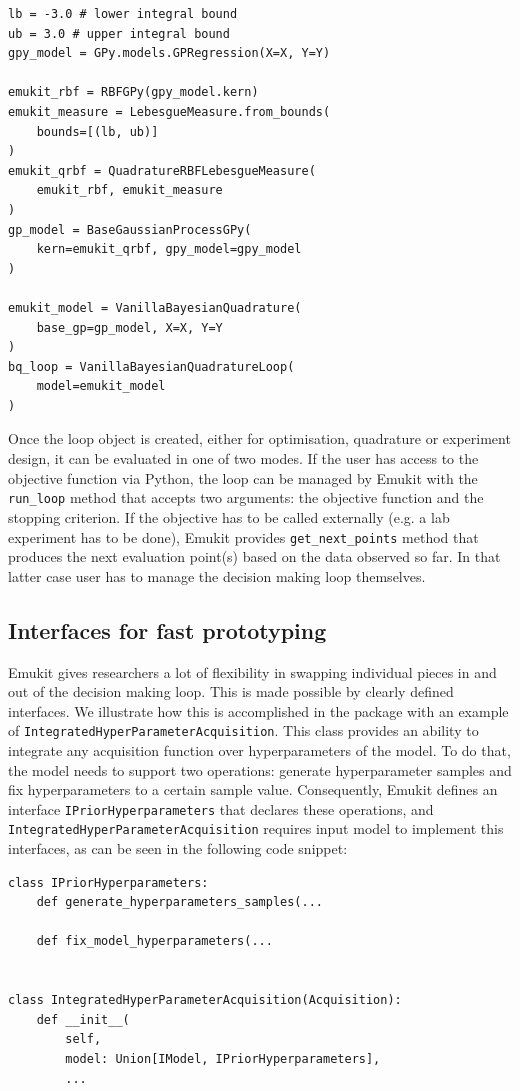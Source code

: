 \begin{verbatim}
lb = -3.0 # lower integral bound
ub = 3.0 # upper integral bound
gpy_model = GPy.models.GPRegression(X=X, Y=Y)

emukit_rbf = RBFGPy(gpy_model.kern)
emukit_measure = LebesgueMeasure.from_bounds(
    bounds=[(lb, ub)]
)
emukit_qrbf = QuadratureRBFLebesgueMeasure(
    emukit_rbf, emukit_measure
)
gp_model = BaseGaussianProcessGPy(
    kern=emukit_qrbf, gpy_model=gpy_model
)

emukit_model = VanillaBayesianQuadrature(
    base_gp=gp_model, X=X, Y=Y
)
bq_loop = VanillaBayesianQuadratureLoop(
    model=emukit_model
)
\end{verbatim}

Once the loop object is created, either for optimisation, quadrature or experiment design, it can be evaluated in one of two modes. If the user has access to the objective function via Python, the loop can be managed by Emukit with the \texttt{run\_loop} method that accepts two arguments: the objective function and the stopping criterion. If the objective has to be called externally (e.g. a lab experiment has to be done), Emukit provides \texttt{get\_next\_points} method that produces the next evaluation point(s) based on the data observed so far. In that latter case user has to manage the decision making loop themselves.

\subsection{Interfaces for fast prototyping}
Emukit gives researchers a lot of flexibility in swapping individual pieces in and out of the decision making loop. This is made possible by clearly defined interfaces. We illustrate how this is accomplished in the package with an example of \texttt{IntegratedHyperParameterAcquisition}. This class provides an ability to integrate any acquisition function over hyperparameters of the model. To do that, the model needs to support two operations: generate hyperparameter samples and fix hyperparameters to a certain sample value. Consequently, Emukit defines an interface \texttt{IPriorHyperparameters} that declares these operations, and \texttt{IntegratedHyperParameterAcquisition} requires input model to implement this interfaces, as can be seen in the following code snippet:

\begin{verbatim}
class IPriorHyperparameters:
    def generate_hyperparameters_samples(...

    def fix_model_hyperparameters(...


class IntegratedHyperParameterAcquisition(Acquisition):
    def __init__(
        self,
        model: Union[IModel, IPriorHyperparameters],
        ...
\end{verbatim}

